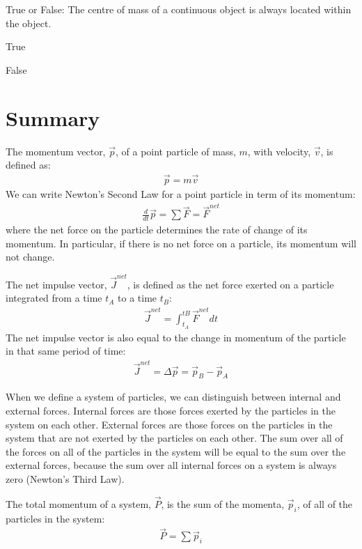 \begin{checkpoint}
\begin{MCquestion}{True or False: The centre of mass of a continuous object is always located within the object.}
\item True
\item False \correct
\end{MCquestion}
\end{checkpoint}

\newpage
\section{Summary}

\begin{chapterSummary}{
The momentum vector, $\vec p$, of a point particle of mass, $m$, with velocity, $\vec v$, is defined as:
\begin{align*}
\vec p = m\vec v
\end{align*}
We can write Newton's Second Law for a point particle in term of its momentum:
\begin{align*}
\frac{d}{dt}\vec p = \sum \vec F = \vec F^{net}
\end{align*}
where the net force on the particle determines the rate of change of its momentum. In particular, if there is no net force on a particle, its momentum will not change.

The net impulse vector, $\vec J^{net}$, is defined as the net force exerted on a particle integrated from a time $t_A$ to a time $t_B$:
\begin{align*}
\vec J^{net} = \int_{t_A}^{tB} \vec F^{net} dt
\end{align*}
The net impulse vector is also equal to the change in momentum of the particle in that same period of time:
\begin{align*}
\vec J^{net} = \Delta \vec p = \vec p_B - \vec p_A
\end{align*}

When we define a system of particles, we can distinguish between internal and external forces. Internal forces are those forces exerted by the particles in the system on each other. External forces are those forces on the particles in the system that are not exerted by the particles on each other. The sum over all of the forces on all of the particles in the system will be equal to the sum over the external forces, because the sum over all internal forces on a system is always zero (Newton's Third Law).

The total momentum of a system, $\vec P$, is the sum of the momenta, $\vec p_i$, of all of the particles in the system:
\begin{align*}
\vec P = \sum \vec p_i
\end{align*}

}
\end{chapterSummary}
